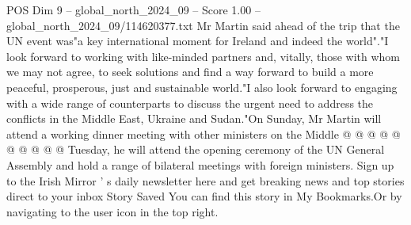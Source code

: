 \begin{textsample}{POS Dim 9 – global\_north\_2024\_09 – Score 1.00 – global\_north\_2024\_09/114620377.txt}
Mr Martin said ahead of the trip that the UN event was"a key international moment for Ireland and indeed the world"."I look forward to working with like-minded partners and, vitally, those with whom we may not agree, to seek solutions and find a way forward to build a more peaceful, prosperous, just and sustainable world."I also look forward to engaging with a wide range of counterparts to discuss the urgent need to address the conflicts in the Middle East, Ukraine and Sudan."On Sunday, Mr Martin will attend a working dinner meeting with other ministers on the Middle @ @ @ @ @ @ @ @ @ @ Tuesday, he will attend the opening ceremony of the UN General Assembly and hold a range of bilateral meetings with foreign ministers.
Sign up to the Irish Mirror ' s daily newsletter here and get breaking news and top stories direct to your inbox Story Saved You can find this story in My Bookmarks.Or by navigating to the user icon in the top right.

\end{textsample}
